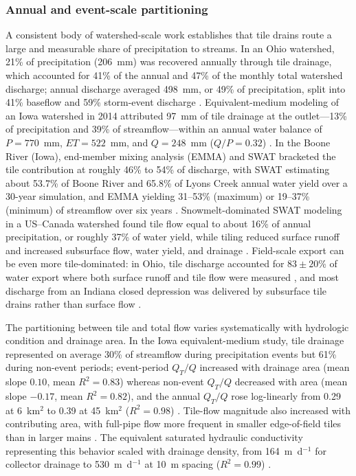 \subsubsection{Annual and event-scale partitioning}

A consistent body of watershed-scale work establishes that tile drains route a large and measurable share of precipitation to streams. In an Ohio watershed, 21\% of precipitation (206~mm) was recovered annually through tile drainage, which accounted for 41\% of the annual and 47\% of the monthly total watershed discharge; annual discharge averaged 498~mm, or 49\% of precipitation, split into 41\% baseflow and 59\% storm-event discharge \parencite{King2014}. Equivalent-medium modeling of an Iowa watershed in 2014 attributed 97~mm of tile drainage at the outlet---13\% of precipitation and 39\% of streamflow---within an annual water balance of $P=770$~mm, $ET=522$~mm, and $Q=248$~mm ($Q/P=0.32$) \parencite{Thomas2016}. In the Boone River (Iowa), end-member mixing analysis (EMMA) and SWAT bracketed the tile contribution at roughly 46\% to 54\% of discharge, with SWAT estimating about 53.7\% of Boone River and 65.8\% of Lyons Creek annual water yield over a 30-year simulation, and EMMA yielding 31--53\% (maximum) or 19--37\% (minimum) of streamflow over six years \parencite{Schilling2019}. Snowmelt-dominated SWAT modeling in a US--Canada watershed found tile flow equal to about 16\% of annual precipitation, or roughly 37\% of water yield, while tiling reduced surface runoff and increased subsurface flow, water yield, and drainage \parencite{Rahman2014}. Field-scale export can be even more tile-dominated: in Ohio, tile discharge accounted for $83\pm20$\% of water export where both surface runoff and tile flow were measured \parencite{Williams2018}, and most discharge from an Indiana closed depression was delivered by subsurface tile drains rather than surface flow \parencite{Williams2019}.

The partitioning between tile and total flow varies systematically with hydrologic condition and drainage area. In the Iowa equivalent-medium study, tile drainage represented on average 30\% of streamflow during precipitation events but 61\% during non-event periods; event-period $Q_T/Q$ increased with drainage area (mean slope $0.10$, mean $R^2=0.83$) whereas non-event $Q_T/Q$ decreased with area (mean slope $-0.17$, mean $R^2=0.82$), and the annual $Q_T/Q$ rose log-linearly from 0.29 at 6~km$^2$ to 0.39 at 45~km$^2$ ($R^2=0.98$) \parencite{Thomas2016}. Tile-flow magnitude also increased with contributing area, with full-pipe flow more frequent in smaller edge-of-field tiles than in larger mains \parencite{King2014}. The equivalent saturated hydraulic conductivity representing this behavior scaled with drainage density, from 164~m~d$^{-1}$ for collector drainage to 530~m~d$^{-1}$ at 10~m spacing ($R^2=0.99$) \parencite{Thomas2016}.

